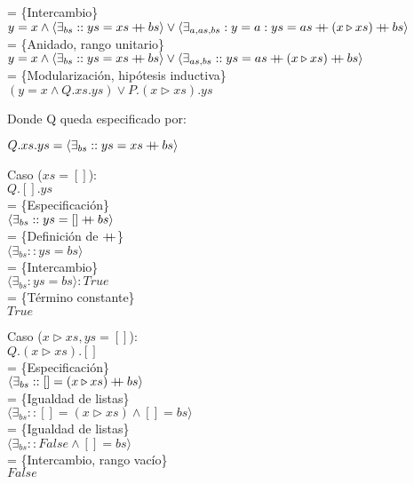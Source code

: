 \documentclass[12pt]{article}
\newcommand{\concat}{%
  \mathbin{{+}\mspace{-8mu}{+}}%
}
\begin{document}
\begin{itemize}
    = \{Intercambio\}\\
    $ y = x \land \langle \exists_{bs} :: ys = xs \concat bs \rangle \lor \langle \exists_{a,as,bs} : y = a : ys = as \concat (x \triangleright xs) \concat bs \rangle $\\
    = \{Anidado, rango unitario\}\\
    $ y = x \land \langle \exists_{bs} :: ys = xs \concat bs \rangle \lor \langle \exists_{as,bs} :: ys = as \concat (x \triangleright xs) \concat bs \rangle $\\
    = \{Modularización, hipótesis inductiva\}\\
    $ (y = x \land Q.xs.ys) \lor P.(x \triangleright xs).ys $

    \bigbreak

    Donde Q queda especificado por:

    $ Q.xs.ys =  \langle \exists_{bs} :: ys = xs \concat bs \rangle $

    \bigbreak

    Caso ($xs = []$):\\
    $ Q.[].ys $\\
    = \{Especificación\}\\
    $ \langle \exists_{bs} :: ys = [] \concat bs \rangle $\\
    = \{Definición de $\concat$\}\\
    $ \langle \exists_{bs} :: ys = bs \rangle $\\
    = \{Intercambio\}\\
    $ \langle \exists_{bs} : ys = bs \rangle : True $\\
    = \{Término constante\}\\
    $ True $

    \bigbreak

    Caso ($x \triangleright xs, ys = []$):\\
    $ Q.(x \triangleright xs).[] $\\
    = \{Especificación\}\\
    $ \langle \exists_{bs} :: [] = (x \triangleright xs) \concat bs \rangle $\\
    = \{Igualdad de listas\}\\
    $ \langle \exists_{bs} :: [] = (x \triangleright xs) \land [] = bs \rangle $\\
    = \{Igualdad de listas\}\\
    $ \langle \exists_{bs} :: False \land [] = bs \rangle $\\
    = \{Intercambio, rango vacío\}\\
    $ False $


\end{itemize}
\end{document}
